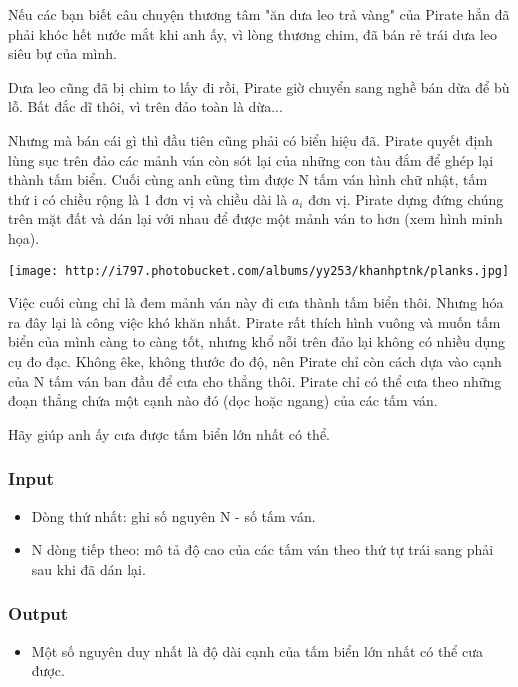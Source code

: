 



   Nếu các bạn biết câu chuyện thương tâm "ăn dưa leo trả vàng" của Pirate hẳn đã phải khóc hết nước mắt khi anh ấy, vì lòng thương chim, đã bán rẻ trái dưa leo siêu bự của mình.  

   Dưa leo cũng đã bị chim to lấy đi rồi, Pirate giờ chuyển sang nghề bán dừa để bù lỗ. Bất đắc dĩ thôi, vì trên đảo toàn là dừa...  

   Nhưng mà bán cái gì thì đầu tiên cũng phải có biển hiệu đã. Pirate quyết định lùng sục trên đảo các mảnh ván còn sót lại của những con tàu đắm để ghép lại thành tấm biển. Cuối cùng anh cũng tìm được N tấm ván hình chữ nhật, tấm thứ i có chiều rộng là 1 đơn vị và chiều dài là $a_{i}$   đơn vị. Pirate dựng đứng chúng trên mặt đất và dán lại với nhau để được một mảnh ván to hơn (xem hình minh họa).  


\texttt{[image: http://i797.photobucket.com/albums/yy253/khanhptnk/planks.jpg]}

   Việc cuối cùng chỉ là đem mảnh ván này đi cưa thành tấm biển thôi. Nhưng hóa ra đây lại là công việc khó khăn nhất. Pirate rất thích hình vuông và muốn tấm biển của mình càng to càng tốt, nhưng khổ nỗi trên đảo lại không có nhiều dụng cụ đo đạc. Không êke, không thước đo độ, nên Pirate chỉ còn cách dựa vào cạnh của N tấm ván ban đầu để cưa cho thẳng thôi. Pirate chỉ có thể cưa theo những đoạn thẳng chứa một cạnh nào đó (dọc hoặc ngang) của các tấm ván.  

   Hãy giúp anh ấy cưa được tấm biển lớn nhất có thể.  

\subsubsection{   Input  }
\begin{itemize}
	\item     Dòng thứ nhất: ghi số nguyên N - số tấm ván.   
	\item     N dòng tiếp theo: mô tả độ cao của các tấm ván theo thứ tự trái sang phải sau khi đã dán lại.   
\end{itemize}

\subsubsection{   Output  }
\begin{itemize}
	\item     Một số nguyên duy nhất là độ dài cạnh của tấm biển lớn nhất có thể cưa được.   
\end{itemize}

